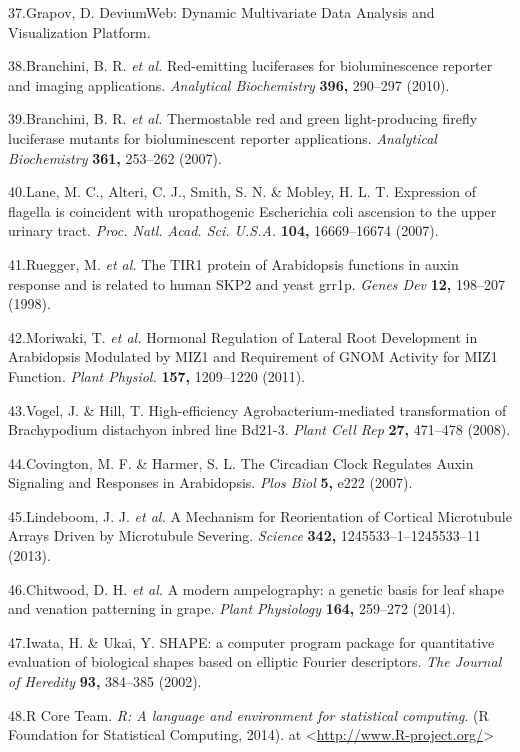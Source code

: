 \documentclass[]{article}
\begin{document}
37.Grapov, D. DeviumWeb: Dynamic Multivariate Data Analysis and
Visualization Platform.

38.Branchini, B. R. \emph{et al.} Red-emitting luciferases for
bioluminescence reporter and imaging applications. \emph{Analytical
Biochemistry} \textbf{396,} 290--297 (2010).

39.Branchini, B. R. \emph{et al.} Thermostable red and green
light-producing firefly luciferase mutants for bioluminescent reporter
applications. \emph{Analytical Biochemistry} \textbf{361,} 253--262
(2007).

40.Lane, M. C., Alteri, C. J., Smith, S. N. \& Mobley, H. L. T.
Expression of flagella is coincident with uropathogenic Escherichia coli
ascension to the upper urinary tract. \emph{Proc. Natl. Acad. Sci.
U.S.A.} \textbf{104,} 16669--16674 (2007).

41.Ruegger, M. \emph{et al.} The TIR1 protein of Arabidopsis functions
in auxin response and is related to human SKP2 and yeast grr1p.
\emph{Genes Dev} \textbf{12,} 198--207 (1998).

42.Moriwaki, T. \emph{et al.} Hormonal Regulation of Lateral Root
Development in Arabidopsis Modulated by MIZ1 and Requirement of GNOM
Activity for MIZ1 Function. \emph{Plant Physiol.} \textbf{157,}
1209--1220 (2011).

43.Vogel, J. \& Hill, T. High-efficiency Agrobacterium-mediated
transformation of Brachypodium distachyon inbred line Bd21-3.
\emph{Plant Cell Rep} \textbf{27,} 471--478 (2008).

44.Covington, M. F. \& Harmer, S. L. The Circadian Clock Regulates Auxin
Signaling and Responses in Arabidopsis. \emph{Plos Biol} \textbf{5,}
e222 (2007).

45.Lindeboom, J. J. \emph{et al.} A Mechanism for Reorientation of
Cortical Microtubule Arrays Driven by Microtubule Severing.
\emph{Science} \textbf{342,} 1245533--1--1245533--11 (2013).

46.Chitwood, D. H. \emph{et al.} A modern ampelography: a genetic basis
for leaf shape and venation patterning in grape. \emph{Plant Physiology}
\textbf{164,} 259--272 (2014).

47.Iwata, H. \& Ukai, Y. SHAPE: a computer program package for
quantitative evaluation of biological shapes based on elliptic Fourier
descriptors. \emph{The Journal of Heredity} \textbf{93,} 384--385
(2002).

48.R Core Team. \emph{R: A language and environment for statistical
computing}. (R Foundation for Statistical Computing, 2014). at
\textless{}\url{http://www.R-project.org/}\textgreater{}
\end{document}
